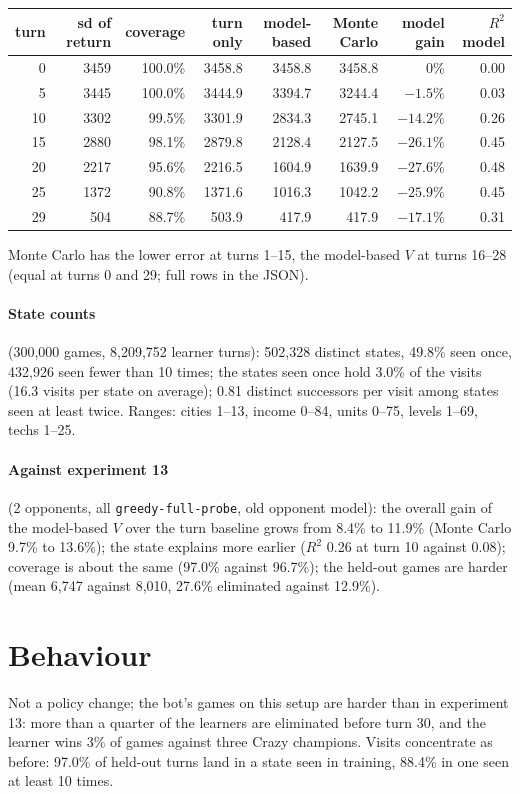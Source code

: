 \documentclass{../polyexp}
\begin{document}
\begin{center}\small
\begin{tabular}{rrrrrrrr}
\toprule
turn & sd of return & coverage & turn only & model-based & Monte Carlo & model gain & $R^2$ model \\
\midrule
0  & 3459 & 100.0\% & 3458.8 & 3458.8 & 3458.8 & 0\%        & 0.00 \\
5  & 3445 & 100.0\% & 3444.9 & 3394.7 & 3244.4 & $-1.5\%$  & 0.03 \\
10 & 3302 & 99.5\%  & 3301.9 & 2834.3 & 2745.1 & $-14.2\%$ & 0.26 \\
15 & 2880 & 98.1\%  & 2879.8 & 2128.4 & 2127.5 & $-26.1\%$ & 0.45 \\
20 & 2217 & 95.6\%  & 2216.5 & 1604.9 & 1639.9 & $-27.6\%$ & 0.48 \\
25 & 1372 & 90.8\%  & 1371.6 & 1016.3 & 1042.2 & $-25.9\%$ & 0.45 \\
29 & 504  & 88.7\%  & 503.9  & 417.9  & 417.9  & $-17.1\%$ & 0.31 \\
\bottomrule
\end{tabular}
\end{center}
Monte Carlo has the lower error at turns 1--15, the model-based $V$ at turns 16--28 (equal at turns 0 and 29; full
rows in the JSON).

\paragraph{State counts} (300{,}000 games, 8{,}209{,}752 learner turns): 502{,}328 distinct states, 49.8\% seen once,
432{,}926 seen fewer than 10 times; the states seen once hold 3.0\% of the visits (16.3 visits per state on
average); 0.81 distinct successors per visit among states seen at least twice. Ranges: cities 1--13, income
0--84, units 0--75, levels 1--69, techs 1--25.

\paragraph{Against experiment 13} (2 opponents, all \texttt{greedy-full-probe}, old opponent model): the overall
gain of the model-based $V$ over the turn baseline grows from 8.4\% to 11.9\% (Monte Carlo 9.7\% to 13.6\%); the
state explains more earlier ($R^2$ 0.26 at turn 10 against 0.08); coverage is about the same (97.0\% against
96.7\%); the held-out games are harder (mean 6{,}747 against 8{,}010, 27.6\% eliminated against 12.9\%).

\section{Behaviour}
Not a policy change; the bot's games on this setup are harder than in experiment 13: more than a quarter of the
learners are eliminated before turn 30, and the learner wins 3\% of games against three Crazy champions. Visits
concentrate as before: 97.0\% of held-out turns land in a state seen in training, 88.4\% in one seen at least 10
times.
\end{document}
